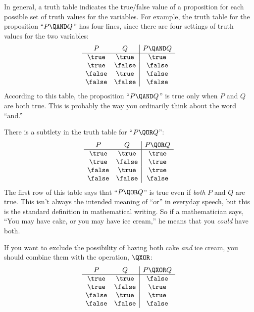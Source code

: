 In general, a truth table indicates the true/false value of a proposition
for each possible set of truth values for the variables.  For example, the
truth table for the proposition ``$P \QAND Q$'' has four lines, since
there are four settings of truth values for the two variables:
%
\[
\begin{array}{cc|c}
P & Q & P \QAND Q \\ \hline
\true & \true & \true \\
\true & \false & \false \\
\false & \true & \false \\
\false & \false & \false
\end{array}
\]
%
According to this table, the proposition ``$P \QAND Q$'' is true only when
$P$ and $Q$ are both true.  This is probably the way you ordinarily think
about the word ``and.''

There is a subtlety in the truth table for ``$P \QOR Q$'':
%
\[
\begin{array}{cc|c}
P & Q & P \QOR Q \\ \hline
\true & \true & \true \\
\true & \false & \true \\
\false & \true & \true \\
\false & \false & \false
\end{array}
\]
%
The first row of this table says that ``$P \QOR Q$'' is true even if
\textit{both} $P$ and $Q$ are true.  This isn't always the intended
meaning of ``or'' in everyday speech, but this is the standard definition
in mathematical writing.  So if a mathematician says, ``You may have cake,
or you may have ice cream,'' he means that you \textit{could} have both.

If you want to exclude the possibility of having both cake \emph{and}
ice cream, you should combine them with the 
operation, $\QXOR$:
%
\[\begin{array}{cc|c}
P & Q & P \QXOR Q \\ \hline
\true & \true & \false \\
\true & \false & \true \\
\false & \true & \true \\
\false & \false & \false
\end{array}
\]

\subsection{\QIMPLIES}

